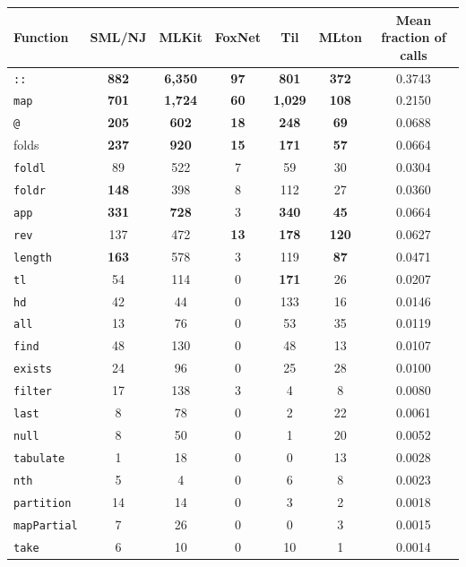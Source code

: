 \documentclass[12pt,abstracton]{scrartcl}
\begin{document}
\begin{table}[h!]
\centering
\begin{tabular}{|l||c|c|c|c|c||c|}
\hline
Function & SML/NJ & MLKit & FoxNet & Til & MLton & Mean fraction of calls \\ \hline\hline
\texttt{::} & \textbf{882} & \textbf{6,350} & \textbf{97} & \textbf{801} & \textbf{372} & 0.3743 \\
\texttt{map} & \textbf{701} & \textbf{1,724} & \textbf{60} & \textbf{1,029} & \textbf{108} & 0.2150 \\
\texttt{@} & \textbf{205} & \textbf{602} & \textbf{18} & \textbf{248} & \textbf{69} & 0.0688 \\
folds & \textbf{237} & \textbf{920} & \textbf{15} & \textbf{171} & \textbf{57} & 0.0664 \\
\hspace{0.2in}\texttt{foldl} & 89 & 522 & 7 & 59 & 30 & 0.0304 \\
\hspace{0.2in}\texttt{foldr} & \textbf{148} & 398 & 8 & 112 & 27 & 0.0360 \\
\texttt{app} & \textbf{331} & \textbf{728} & 3 & \textbf{340} & \textbf{45} & 0.0664 \\
\texttt{rev} & 137 & 472 & \textbf{13} & \textbf{178} & \textbf{120} & 0.0627 \\
\texttt{length} & \textbf{163} & 578 & 3 & 119 & \textbf{87} & 0.0471 \\
\texttt{tl} & 54 & 114 & 0 & \textbf{171} & 26 & 0.0207 \\
\texttt{hd} & 42 & 44 & 0 & 133 & 16 & 0.0146 \\
\texttt{all} & 13 & 76 & 0 & 53 & 35 & 0.0119 \\
\texttt{find} & 48 & 130 & 0 & 48 & 13 & 0.0107 \\
\texttt{exists} & 24 & 96 & 0 & 25 & 28 & 0.0100 \\
\texttt{filter} & 17 & 138 & 3 & 4 & 8 & 0.0080 \\
\texttt{last} & 8 & 78 & 0 & 2 & 22 & 0.0061 \\
\texttt{null} & 8 & 50 & 0 & 1  & 20 & 0.0052 \\
\texttt{tabulate} & 1 & 18 & 0 & 0  & 13 & 0.0028 \\
\texttt{nth} & 5 & 4 & 0 & 6 & 8 & 0.0023 \\
\texttt{partition} & 14  & 14 & 0 & 3 & 2 & 0.0018 \\
\texttt{mapPartial} & 7 & 26 & 0 & 0 & 3 & 0.0015 \\
\texttt{take} & 6 & 10 & 0 & 10 & 1 & 0.0014 \\

\end{tabular}
\end{table}
\end{document}
